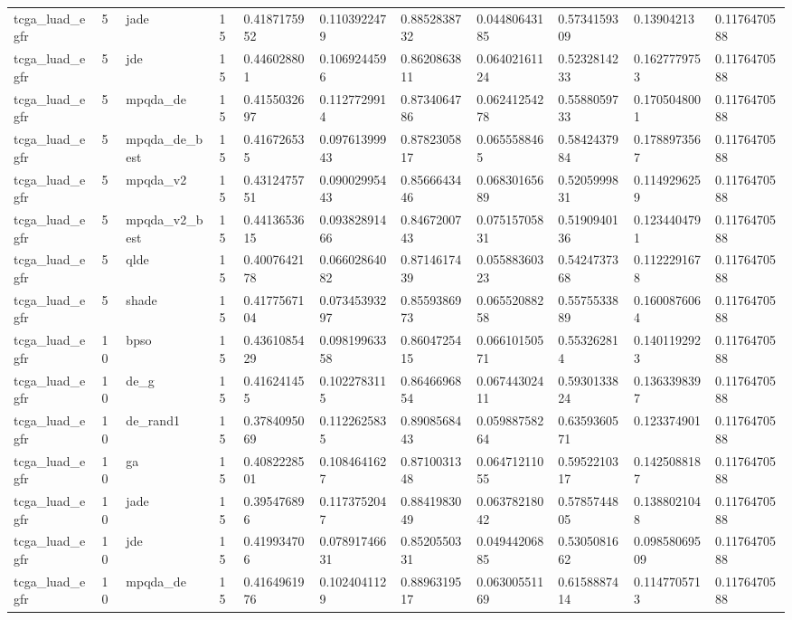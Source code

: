 \begin{table}[t]
\begin{tabular}{lllllllllll}
tcga\_luad\_egfr & 5 & jade & 15 & 0.4187175952 & 0.1103922479 & 0.8852838732 & 0.04480643185 & 0.5734159309 & 0.13904213 & 0.1176470588 \\
tcga\_luad\_egfr & 5 & jde & 15 & 0.446028801 & 0.1069244596 & 0.8620863811 & 0.06402161124 & 0.5232814233 & 0.1627779753 & 0.1176470588 \\
tcga\_luad\_egfr & 5 & mpqda\_de & 15 & 0.4155032697 & 0.1127729914 & 0.8734064786 & 0.06241254278 & 0.5588059733 & 0.1705048001 & 0.1176470588 \\
tcga\_luad\_egfr & 5 & mpqda\_de\_best & 15 & 0.416726535 & 0.09761399943 & 0.8782305817 & 0.0655588465 & 0.5842437984 & 0.1788973567 & 0.1176470588 \\
tcga\_luad\_egfr & 5 & mpqda\_v2 & 15 & 0.4312475751 & 0.09002995443 & 0.8566643446 & 0.06830165689 & 0.5205999831 & 0.1149296259 & 0.1176470588 \\
tcga\_luad\_egfr & 5 & mpqda\_v2\_best & 15 & 0.4413653615 & 0.09382891466 & 0.8467200743 & 0.07515705831 & 0.5190940136 & 0.1234404791 & 0.1176470588 \\
tcga\_luad\_egfr & 5 & qlde & 15 & 0.4007642178 & 0.06602864082 & 0.8714617439 & 0.05588360323 & 0.5424737368 & 0.1122291678 & 0.1176470588 \\
tcga\_luad\_egfr & 5 & shade & 15 & 0.4177567104 & 0.07345393297 & 0.8559386973 & 0.06552088258 & 0.5575533889 & 0.1600876064 & 0.1176470588 \\
tcga\_luad\_egfr & 10 & bpso & 15 & 0.4361085429 & 0.09819963358 & 0.8604725415 & 0.06610150571 & 0.553262814 & 0.1401192923 & 0.1176470588 \\
tcga\_luad\_egfr & 10 & de\_g & 15 & 0.416241455 & 0.1022783115 & 0.8646696854 & 0.06744302411 & 0.5930133824 & 0.1363398397 & 0.1176470588 \\
tcga\_luad\_egfr & 10 & de\_rand1 & 15 & 0.3784095069 & 0.1122625835 & 0.8908568443 & 0.05988758264 & 0.6359360571 & 0.123374901 & 0.1176470588 \\
tcga\_luad\_egfr & 10 & ga & 15 & 0.4082228501 & 0.1084641627 & 0.8710031348 & 0.06471211055 & 0.5952210317 & 0.1425088187 & 0.1176470588 \\
tcga\_luad\_egfr & 10 & jade & 15 & 0.395476896 & 0.1173752047 & 0.8841983049 & 0.06378218042 & 0.5785744805 & 0.1388021048 & 0.1176470588 \\
tcga\_luad\_egfr & 10 & jde & 15 & 0.419934706 & 0.07891746631 & 0.8520550331 & 0.04944206885 & 0.5305081662 & 0.09858069509 & 0.1176470588 \\
tcga\_luad\_egfr & 10 & mpqda\_de & 15 & 0.4164961976 & 0.1024041129 & 0.8896319517 & 0.06300551169 & 0.6158887414 & 0.1147705713 & 0.1176470588 \\

\end{tabular}
\end{table}
